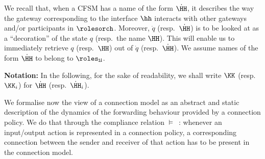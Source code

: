 We recall that, %
when a CFSM has a name of the form $\dot \HH$, it describes the
way the gateway corresponding to the interface $\hh$ interacts with other gateways and/or 
participants in $\rolesorch$.
Moreover, $\dot q$ (resp.\ $\dot\HH$) is to be looked at as a ``decoration'' of 
the state $q$ (resp.\ the name $\HH$). 
This will enable us to immediately retrieve $q$ (resp.\ $\HH$) out of  $\dot q$ (resp.\ $\dot\HH$).
We assume names of the form $\dot \HH$ to belong to $\roles_\mathfrak{U}$.

\medskip
\noindent
{\bf Notation:} In the following, for the sake of readability, we shall 
write $\KK$ (resp.\ $\KK_i$) for $\dot\HH$ (resp.\ $\dot{\HH}_i$).\\

\smallskip


We formalise now the view of a connection model as an abstract and static description
of the dynamics of the forwarding behaviour provided by a connection policy.
We do that through the
compliance relation $\models$\ : whenever an input/output action is
represented in a connection policy, a corresponding connection between the sender and receiver
of that action has to be present in the connection model. 


